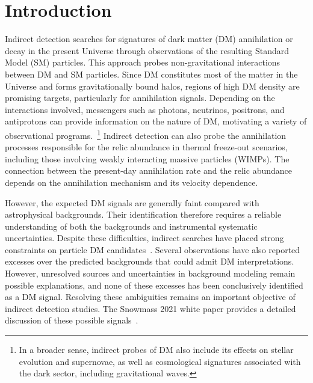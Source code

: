 \documentclass[superscriptaddress,
showpacs,preprintnumbers,nofootinbib,eqsecnum,amsmath,amssymb,aps,11pt, groupedaddress, floatfix]{revtex4-2}
\begin{document}
\maketitle

\tableofcontents



\newpage



\section{Introduction}



Indirect detection searches for signatures of dark matter (DM)
annihilation or decay in the present Universe through observations
of the resulting Standard Model (SM) particles.
This approach probes non-gravitational interactions between DM and
SM particles. Since DM constitutes most of the matter in the
Universe and forms gravitationally bound halos, regions of high
DM density are promising targets, particularly for annihilation
signals.
Depending on the interactions involved, messengers such as photons, neutrinos, positrons, and antiprotons can provide information on the nature of DM, motivating a variety of observational
programs.~\footnote{In a broader sense, indirect probes of DM also
include its effects on stellar evolution and supernovae, as well
as cosmological signatures associated with the dark sector,
including gravitational waves.}
Indirect detection can also probe the annihilation processes
responsible for the relic abundance in thermal freeze-out
scenarios, including those involving weakly interacting massive
particles (WIMPs). The connection between the present-day
annihilation rate and the relic abundance depends on the
annihilation mechanism and its velocity dependence.

However, the expected DM signals are generally faint compared with astrophysical backgrounds.
Their identification therefore requires a reliable understanding
of both the backgrounds and instrumental systematic uncertainties.
Despite these difficulties, indirect searches have placed strong
constraints on particle DM candidates~\cite{Cooley:2022ufh}.
Several observations have also reported excesses over the
predicted backgrounds that could admit DM interpretations.
However, unresolved sources and uncertainties in background
modeling remain possible explanations, and none of these excesses has been conclusively identified as a DM signal.
Resolving these ambiguities remains an important objective of
indirect detection studies.
The Snowmass 2021 white paper provides a detailed discussion
of these possible signals~\cite{Leane:2022bfm}.
\end{document}
